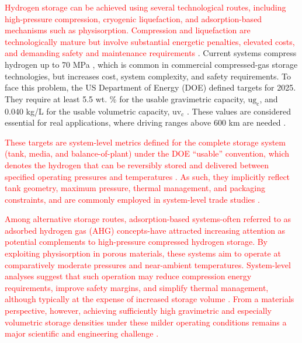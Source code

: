 \documentclass[review]{elsarticle}
\newcommand{\ugc}{\mathrm{ug_c}}
\newcommand{\uvc}{\mathrm{uv_c}}
\begin{document}
\textcolor{red}{Hydrogen storage can be achieved using several technological routes, including high-pressure compression, cryogenic liquefaction, and adsorption-based mechanisms such as physisorption. Compression and liquefaction are technologically mature but involve substantial energetic penalties, elevated costs, and demanding safety and maintenance requirements \cite{cwlcz23,bww+21,breeze18,hv14,atd20,rhs+22,h2tanks,llk+22,zuttel03}}. Current systems compress hydrogen up to 70 MPa \cite{atd20,hv14,cwlcz23,rhs+22,breeze18,dy11}, which is common in commercial compressed-gas storage technologies, but increases cost, system complexity, and safety requirements. To face this problem, the US Department of Energy (DOE) defined targets for 2025. They require at least 5.5 wt. \% for the usable gravimetric capacity, $\ugc$, and 0.040 kg/L for the usable volumetric capacity, $\uvc$ \cite{doe25,ahg+18}. These values are considered essential for real applications, where driving ranges above 600 km are needed \cite{cwlcz23,bww+21,breeze18,hv14,dy11}.

\textcolor{red}{These targets are system-level metrics defined for the complete storage system (tank, media, and balance-of-plant) under the DOE ``usable'' convention, which denotes the hydrogen that can be reversibly stored and delivered between specified operating pressures and temperatures \cite{usdrivetarget2017,usdrivetarget17,doetables17,doe25}. As such, they implicitly reflect tank geometry, maximum pressure, thermal management, and packaging constraints, and are commonly employed in system-level trade studies \cite{ahluwalia24,hsecoe19}.}



\textcolor{red}{
Among alternative storage routes, adsorption-based systems-often referred to as adsorbed hydrogen gas (AHG) concepts-have attracted increasing attention as potential complements to high-pressure compressed hydrogen storage. By exploiting physisorption in porous materials, these systems aim to operate at comparatively moderate pressures and near-ambient temperatures. System-level analyses suggest that such operation may reduce compression energy requirements, improve safety margins, and simplify thermal management, although typically at the expense of increased storage volume \cite{zuttel03,ahp12}. From a materials perspective, however, achieving sufficiently high gravimetric and especially volumetric storage densities under these milder operating conditions remains a major scientific and engineering challenge \cite{jbpr23,nasm22,zwy+22,fvy+22,Li22,sap+21,jje+21,ykc+18,wcd+18,yck+17,bd15,ahluwalia24,hsecoe19,doerecord25}.
}
\end{document}
